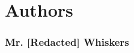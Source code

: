 \section{Authors}\label{sec:authors}

\subsubsection{Mr. [Redacted] Whiskers}\label{subsec:mrwhiskers} 
\lipsumeow
